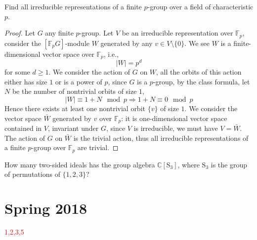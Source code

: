 \documentclass[openany]{book}
\newcommand{\F}{\mathbb{F}}
\begin{document}
\begin{prob}
    Find all irreducible representations of a finite \(p\)-group over a field of characteristic \(p\).
\end{prob}
\begin{proof}
    Let $G$ any finite $p$-group. Let $V$ be an irreducible representation over $\F_p$, consider the $[\F_pG]$-module $W$ generated by any $v\in V\setminus\{0\}$. We see $W$ is a finite-dimensional vector space over $\F_p$, i.e., 
    \begin{equation*}
        |W|=p^d
    \end{equation*}
    for some $d\geq 1$. We consider the action of $G$ on $W$, all the orbits of this action either has size $1$ or is a power of $p$, since $G$ is a $p$-group, by the class formula, let $N$ be the number of nontrivial orbits of size $1$, 
    \begin{equation*}
        |W|\equiv 1+N\mod p\Rightarrow 1+N\equiv 0\mod p
    \end{equation*}
    Hence there exists at least one nontrivial orbit $\{v\}$ of size $1$. We consider the vector space $\bar{W}$ generated by $v$ over $\F_p$: it is one-dimensional vector space contained in $V$, invariant under $G$, since $V$ is irreducible, we must have $V=\bar{W}$. The action of $G$ on $\bar{W}$ is the trivial action, thus all irreducible representations of a finite $p$-group over $\F_p$ are trivial.
\end{proof}


\begin{prob}
    How many two-sided ideals has the group algebra \(\mathbb{C}[\mathrm{S}_{3}]\), where \(\mathrm{S}_{3}\) is the group of permutations of \(\{1,2,3\}\)?
\end{prob}




\chapter{Spring 2018}


\textcolor{red}{1,2,3,5}
\end{document}

